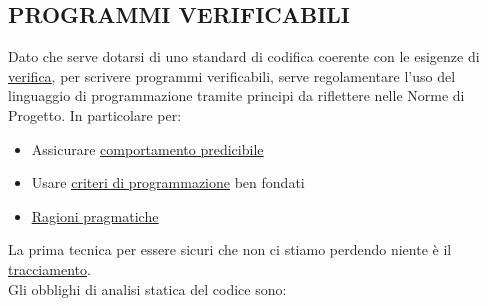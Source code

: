 		\subsection{PROGRAMMI VERIFICABILI}		\label{programmiverificabili} %
		Dato che serve dotarsi di uno standard di codifica coerente con le esigenze di \underline{\hyperref[verificare]{verifica}}, per scrivere programmi verificabili, serve regolamentare l’uso del linguaggio di programmazione tramite principi da riflettere nelle Norme di Progetto. In particolare per:
		\begin{itemize}
			\item Assicurare \underline{\hyperref[comportamentopredicibile]{comportamento predicibile}}
			\item Usare \underline{\hyperref[criteriprog]{criteri di programmazione}} ben fondati
			\item \underline{\hyperref[pragmatico]{Ragioni pragmatiche}}
		\end{itemize}
		La prima tecnica per essere sicuri che non ci stiamo perdendo niente è il \underline{\hyperref[tracciamento]{tracciamento}}. \\
		Gli obblighi di analisi statica del codice sono: %
